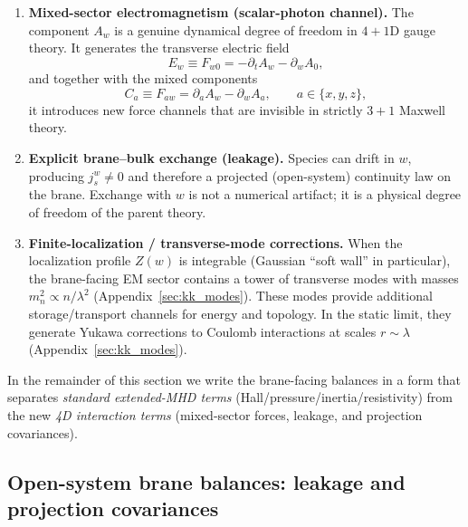 \documentclass[11pt]{article}
\begin{document}
\begin{enumerate}[leftmargin=1.6em]
\item \textbf{Mixed-sector electromagnetism (scalar-photon channel).}
The component \(A_w\) is a genuine dynamical degree of freedom in \(4+1\)D gauge theory.
It generates the transverse electric field
\begin{equation}
E_w \equiv F_{w0} = -\partial_t A_w - \partial_w A_0,
\label{eq:Ew_def_beyond}
\end{equation}
and together with the mixed components
\begin{equation}
C_a \equiv F_{aw} = \partial_a A_w - \partial_w A_a,
\qquad a\in\{x,y,z\},
\label{eq:Ca_def_beyond}
\end{equation}
it introduces new force channels that are invisible in strictly \(3+1\) Maxwell theory.

\item \textbf{Explicit brane--bulk exchange (leakage).}
Species can drift in \(w\), producing \(j_s^w\neq 0\) and therefore a projected
(open-system) continuity law on the brane. Exchange with \(w\) is not a numerical artifact;
it is a physical degree of freedom of the parent theory.

\item \textbf{Finite-localization / transverse-mode corrections.}
When the localization profile \(Z(w)\) is integrable (Gaussian ``soft wall'' in particular),
the brane-facing EM sector contains a tower of transverse modes with masses
\(m_n^2\propto n/\lambda^2\) (Appendix~\ref{sec:kk_modes}). These modes provide additional
storage/transport channels for energy and topology. In the static limit, they generate
Yukawa corrections to Coulomb interactions at scales \(r\sim\lambda\)
(Appendix~\ref{sec:kk_modes}).
\end{enumerate}

In the remainder of this section we write the brane-facing balances in a form that separates
\emph{standard extended-MHD terms} (Hall/pressure/inertia/resistivity) from the new
\emph{4D interaction terms} (mixed-sector forces, leakage, and projection covariances).

\subsection{Open-system brane balances: leakage and projection covariances}
\label{sec:open_system_brane_balances}
\end{document}
